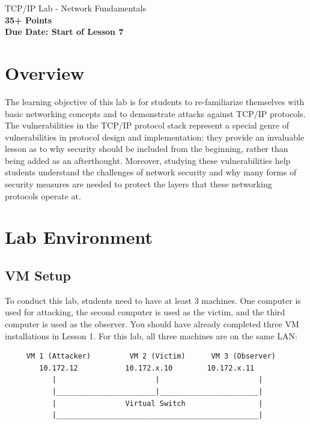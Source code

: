 \documentclass{article}
\begin{document}
\begin{center}
{\LARGE TCP/IP Lab - Network Fundamentals}\\
\textbf{35+
Points }\\
\textbf{Due Date: Start of Lesson 7}
\end{center}
\copyrightnoticeA




\setcounter{task}{1}
\newcommand{\tasks} {\bf {\noindent (\arabic{task})} \addtocounter{task}{1} \,}

\setcounter{Question}{1}
\newcommand{\tasks} {\bf {\noindent (\arabic{Question})} \addtocounter{Question}{1} \,}

\section{Overview}

The learning objective of this lab is for students to 
re-familiarize themselves with basic networking concepts and to demonstrate attacks against TCP/IP protocols.
The vulnerabilities in the TCP/IP protocol stack represent a special genre of 
vulnerabilities in protocol design and
implementation; they provide an invaluable lesson as to why security should 
be included from the beginning, rather than being added as an afterthought.
Moreover, studying these vulnerabilities help students understand the
challenges of network security and why many forms of security measures are needed to protect the layers that these networking protocols operate at.



\section{Lab Environment}
\subsection{VM Setup} To conduct this lab, students need to have at least 3 machines. One computer
is used for attacking, the second computer is used as the victim, and 
the third computer is used as the observer. You should have already completed three VM installations in Lesson 1.
For this lab, all three machines are on the same LAN:
\begin{verbatim}
     VM 1 (Attacker)         VM 2 (Victim)      VM 3 (Observer)
        10.172.12           10.172.x.10        10.172.x.11
           |                       |                       |
           |_______________________|_______________________|
           |                Virtual Switch                 |
           |_______________________________________________|
\end{verbatim}
\end{document}
